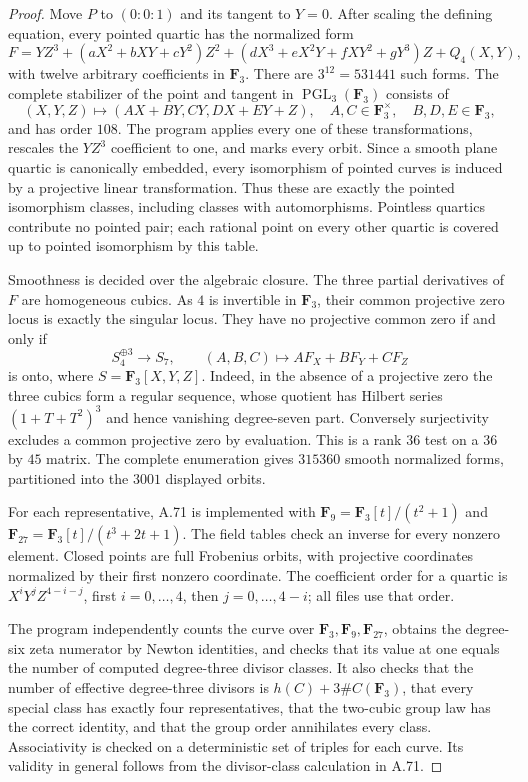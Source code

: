 \documentclass[11pt]{article}
\begin{document}
\begin{proof}
Move $P$ to $(0:0:1)$ and its tangent to $Y=0$.
After scaling the defining equation, every pointed quartic
has the normalized form
\[
 F=YZ^3+(aX^2+bXY+cY^2)Z^2
       +(dX^3+eX^2Y+fXY^2+gY^3)Z+Q_4(X,Y),
\]
with twelve arbitrary coefficients in $\mathbf F_3$.
There are $3^{12}=531441$ such forms. The complete
stabilizer of the point and tangent in
$\operatorname{PGL}_3(\mathbf F_3)$ consists of
\[
 (X,Y,Z)\longmapsto(AX+BY,CY,DX+EY+Z),
 \quad A,C\in\mathbf F_3^\times,
 \quad B,D,E\in\mathbf F_3,
\]
and has order $108$. The program applies every one of
these transformations, rescales the $YZ^3$ coefficient
to one, and marks every orbit. Since a smooth plane
quartic is canonically embedded, every isomorphism of
pointed curves is induced by a projective linear
transformation. Thus these are exactly the pointed
isomorphism classes, including classes with automorphisms.
Pointless quartics contribute no pointed pair; each rational
point on every other quartic is covered up to pointed
isomorphism by this table.

Smoothness is decided over the algebraic closure. The three
partial derivatives of $F$ are homogeneous cubics. As
$4$ is invertible in $\mathbf F_3$, their common
projective zero locus is exactly the singular locus.
They have no projective common zero if and only if
\[
  S_4^{\oplus3}\longrightarrow S_7,
  \qquad(A,B,C)\longmapsto AF_X+BF_Y+CF_Z
\]
is onto, where $S=\mathbf F_3[X,Y,Z]$.
Indeed, in the absence of a projective zero the three
cubics form a regular sequence, whose quotient has
Hilbert series $(1+T+T^2)^3$ and hence vanishing
degree-seven part. Conversely surjectivity excludes a
common projective zero by evaluation. This is a rank
$36$ test on a $36$ by $45$ matrix. The complete
enumeration gives $315360$ smooth normalized forms,
partitioned into the $3001$ displayed orbits.

For each representative, A.71 is implemented with
$\mathbf F_9=\mathbf F_3[t]/(t^2+1)$ and
$\mathbf F_{27}=\mathbf F_3[t]/(t^3+2t+1)$.
The field tables check an inverse for every nonzero
element. Closed points are full Frobenius orbits,
with projective coordinates normalized by their first
nonzero coordinate. The coefficient order for a quartic
is $X^iY^jZ^{4-i-j}$, first $i=0,\ldots,4$, then
$j=0,\ldots,4-i$; all files use that order.

The program independently counts the curve over
$\mathbf F_3,\mathbf F_9,\mathbf F_{27}$, obtains
the degree-six zeta numerator by Newton identities,
and checks that its value at one equals the number
of computed degree-three divisor classes. It also
checks that the number of effective degree-three
divisors is $h(C)+3\#C(\mathbf F_3)$, that every
special class has exactly four representatives,
that the two-cubic group law has the correct identity,
and that the group order annihilates every class.
Associativity is checked on a deterministic set of
triples for each curve. Its validity in general follows
from the divisor-class calculation in A.71.


\end{proof}
\end{document}

